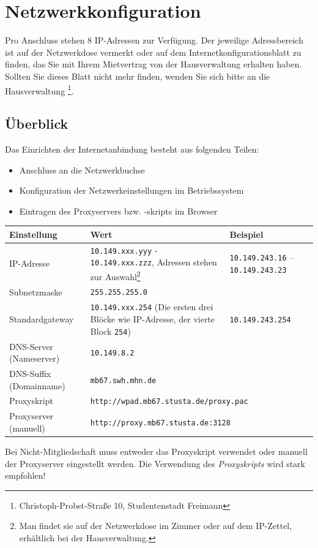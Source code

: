 \documentclass[a4paper,12pt]{scrartcl}
\begin{document}
\newpage

\section*{Netzwerkkonfiguration}

Pro Anschluss stehen 8 IP-Adressen zur Verfügung. Der jeweilige Adressbereich ist auf der Netzwerkdose vermerkt oder auf dem Internetkonfigurationsblatt zu finden, das Sie mit Ihrem Mietvertrag von der Hausverwaltung erhalten haben. Sollten Sie dieses Blatt nicht mehr finden, wenden Sie sich bitte an die Hausverwaltung \footnote{Christoph-Probst-Straße 10, Studentenstadt Freimann}.

\subsection*{Überblick}

Das Einrichten der Internetanbindung besteht aus folgenden Teilen:
\begin{itemize}
    \item Anschluss an die Netzwerkbuchse
    \item Konfiguration der Netzwerkeinstellungen im Betriebssystem
    \item Eintragen des Proxyservers bzw. -skripts im Browser
\end{itemize}


\begin{center}
  \begin{tabularx}{\linewidth}{|lXp{.2\linewidth}|}
    \hline
    Einstellung & Wert & Beispiel \\
    \hline \hline
    IP-Adresse & \nolinkurl{10.149.xxx.yyy} - \nolinkurl{10.149.xxx.zzz}, \newline 8 Adressen stehen zur Auswahl\footnote{Man findet sie auf der Netzwerkdose im Zimmer oder auf dem IP-Zettel, erhältlich bei der Hausverwaltung.} & \nolinkurl{10.149.243.16} – \nolinkurl{10.149.243.23} \\
    \hline
    Subnetzmaske & \nolinkurl{255.255.255.0} & \\
    \hline
    Standardgateway & \nolinkurl{10.149.xxx.254} \newline (Die ersten drei Blöcke wie IP-Adresse, der vierte Block \nolinkurl{254}) & \nolinkurl{10.149.243.254} \\
    \hline
	DNS-Server (Nameserver) & \nolinkurl{10.149.8.2} & \\
    \hline
    DNS-Suffix (Domainname) & \nolinkurl{mb67.swh.mhn.de} & \\
    \hline
    Proxyskript & \multicolumn{2}{l|}{\nolinkurl{http://wpad.mb67.stusta.de/proxy.pac}} \\
    \hline
    Proxyserver (manuell) & \multicolumn{2}{l|}{\nolinkurl{http://proxy.mb67.stusta.de:3128}} \\
    \hline
  \end{tabularx}
\end{center}
Bei Nicht-Mitgliedschaft muss entweder das Proxyskript verwendet oder manuell der Proxyserver eingestellt werden. Die Verwendung des \emph{Proxyskripts} wird stark empfohlen!
\end{document}
